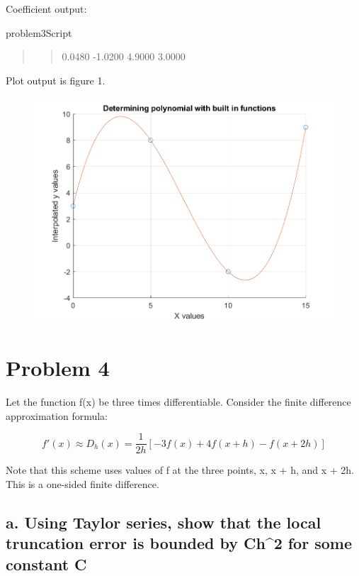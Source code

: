 \documentclass[]{article}
\begin{document}
Coefficient output:

problem3Script

\begin{quote}
\begin{quote}
0.0480 -1.0200 4.9000 3.0000
\end{quote}
\end{quote}

Plot output is figure 1.

\begin{figure}
\centering
\includegraphics{./Media/polyPlot.png}
\caption{}
\end{figure}

\section{Problem 4}\label{problem-4}

Let the function f(x) be three times differentiable. Consider the finite
difference approximation formula:

\[f'(x) \approx D_h(x) = \frac1{2h}[-3f(x) + 4f(x+h) - f(x+2h)]\]

Note that this scheme uses values of f at the three points, x, x + h,
and x + 2h. This is a one-sided finite difference.

\subsection{a. Using Taylor series, show that the local truncation error
is bounded by Ch\^{}2 for some constant
C}\label{a.-using-taylor-series-show-that-the-local-truncation-error-is-bounded-by-ch2-for-some-constant-c}
\end{document}
